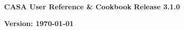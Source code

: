 \pagestyle{empty}

\begin{center}
\Huge
{\bf CASA User Reference \& Cookbook} 
\break 
\break 
\huge
{\bf Release 3.1.0}
\break 
\end{center}
\normalsize
\vspace{2.5cm}
\begin{figure}[h!]
\begin{center}
\end{center}
\end{figure}


\Large
\vfill
\begin{center}
{\bf Version: \today}
\end{center}
\normalsize

\pagebreak
